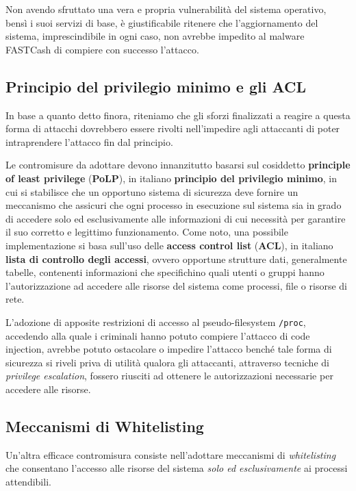 \documentclass[10pt,a4paper, titlepage]{report}
\begin{document}
Non avendo sfruttato una vera e propria vulnerabilità del sistema operativo, bensì i suoi servizi di base, è giustificabile ritenere che l'aggiornamento del sistema, imprescindibile in ogni caso, non avrebbe impedito al malware FASTCash di compiere con successo l'attacco. 

\subsection{Principio del privilegio minimo e gli ACL}

In base a quanto detto finora, riteniamo che gli sforzi finalizzati a reagire a questa forma di attacchi dovrebbero essere rivolti nell'impedire agli attaccanti di poter intraprendere l'attacco fin dal principio. 

Le contromisure da adottare devono innanzitutto basarsi sul cosiddetto \textbf{principle of least privilege} (\textbf{PoLP}), in italiano \textbf{principio del privilegio minimo}, in cui si stabilisce che un opportuno sistema di sicurezza deve fornire un meccanismo che assicuri che ogni processo in esecuzione sul sistema sia in grado di accedere solo ed esclusivamente alle informazioni di cui necessità per garantire il suo corretto e legittimo funzionamento. Come noto, una possibile implementazione si basa sull'uso delle \textbf{access control list} (\textbf{ACL}), in italiano \textbf{lista di controllo degli accessi}, ovvero opportune strutture dati, generalmente tabelle, contenenti informazioni che specifichino quali utenti o gruppi hanno l'autorizzazione ad accedere alle risorse del sistema come processi, file o risorse di rete.

L'adozione di apposite restrizioni di accesso al pseudo-filesystem \texttt{/proc}, accedendo alla quale i criminali hanno potuto compiere l'attacco di code injection, avrebbe potuto ostacolare o impedire l'attacco benché tale forma di sicurezza si riveli priva di utilità qualora gli attaccanti, attraverso tecniche di \textit{privilege escalation}, fossero riusciti ad ottenere le autorizzazioni necessarie per accedere alle risorse.

\subsection{Meccanismi di Whitelisting}

Un'altra efficace contromisura consiste nell'adottare meccanismi di \textit{whitelisting} che consentano l'accesso alle risorse del sistema \textit{solo ed esclusivamente} ai processi attendibili. 
\end{document}
